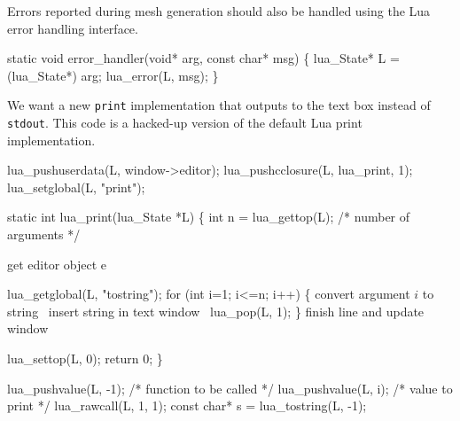 Errors reported during mesh generation should also be handled
using the Lua error handling interface.

\nwenddocs{}\plusendmoddef
static void error_handler(void* arg, const char* msg)
\{
    lua_State* L = (lua_State*) arg;
    lua_error(L, msg);
\}

\nwendcode{}\nwdocspar

We want a new {\tt{}print} implementation that outputs to the 
text box instead of {\tt{}stdout}.  This code is a hacked-up
version of the default Lua print implementation.

\nwenddocs{}\plusendmoddef
lua_pushuserdata(L, window->editor);
lua_pushcclosure(L, lua_print, 1);
lua_setglobal(L, "print");

\nwendcode{}\nwdocspar

\nwenddocs{}\plusendmoddef
static int lua_print(lua_State *L)
\{
    int n = lua_gettop(L);  /* number of arguments */

    \LA{}get editor object \code{}e\edoc{}~{\nwtagstyle{}}\RA{}

    lua_getglobal(L, "tostring");
    for (int i=1; i<=n; i++) \{
        \LA{}convert argument $i$ to string~{\nwtagstyle{}}\RA{}
        \LA{}insert string in text window~{\nwtagstyle{}}\RA{}
        lua_pop(L, 1);
    \}
    \LA{}finish line and update window~{\nwtagstyle{}}\RA{}

    lua_settop(L, 0);
    return 0;
\}

\nwendcode{}\nwdocspar

\nwenddocs{}\endmoddef
lua_pushvalue(L, -1);  /* function to be called */
lua_pushvalue(L,  i);  /* value to print */
lua_rawcall(L, 1, 1);
const char* s = lua_tostring(L, -1);
\nwendcode{}\nwdocspar

